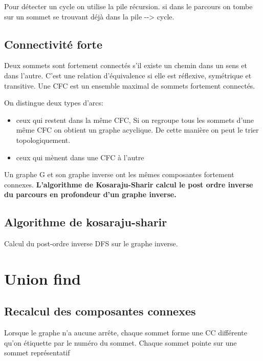 \documentclass[
]{article}
\begin{document}
Pour détecter un cycle on utilise la pile récursion. si dans le parcours
on tombe sur un sommet se trouvant déjà dans la pile -\/-\textgreater{}
cycle.

\hypertarget{header-n51}{%
\subsection{Connectivité forte }\label{header-n51}}

Deux sommets sont fortement connectés s'il existe un chemin dans un sens
et dans l'autre. C'est une relation d'équivalence si elle est réflexive,
symétrique et transitive. Une CFC est un ensemble maximal de sommets
fortement connectés.

On distingue deux types d'arcs:

\begin{itemize}
\item
  ceux qui restent dans la même CFC, Si on regroupe tous les sommets
  d'une même CFC on obtient un graphe acyclique. De cette manière on
  peut le trier topologiquement. 
\item
  ceux qui mènent dans une CFC à l'autre
\end{itemize}

Un graphe G et son graphe inverse ont les mêmes composantes fortement
connexes. \textbf{L'algorithme de Kosaraju-Sharir calcul le post ordre
inverse du parcours en profondeur d'un graphe inverse.}

\hypertarget{header-n60}{%
\subsection{Algorithme de kosaraju-sharir }\label{header-n60}}

Calcul du post-ordre inverse DFS sur le graphe inverse.

\hypertarget{header-n62}{%
\section{Union find }\label{header-n62}}

\hypertarget{header-n63}{%
\subsection{Recalcul des composantes connexes}\label{header-n63}}

Lorsque le graphe n'a aucune arrête, chaque sommet forme une CC
différente qu'on étiquette par le numéro du sommet. Chaque sommet pointe
sur une sommet représentatif
\end{document}
